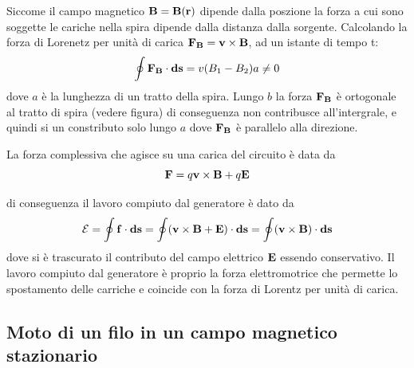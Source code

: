 Siccome il campo magnetico $\bold{B} = \bold{B}(\bold{r})$ dipende dalla poszione la forza a cui sono soggette le cariche nella spira dipende dalla distanza dalla sorgente. Calcolando la forza di Lorenetz  per unit\`a di carica  $\bold{F_B} = \bold{v} \times \bold{B}$, ad un istante di tempo t:
\begin{equation*}
	\oint \bold{F_B} \cdot \bold{ds} = v(B_1 - B_2)a \neq 0 
\end{equation*}
dove $a$ \`e la lunghezza di un tratto della spira.  Lungo $b$ la forza $\bold{F_B}$ \`e ortogonale al tratto di spira (vedere figura) di conseguenza non contribusce all'intergrale, e quindi si un constributo solo lungo $a$ dove $\bold{F_B}$ \`e parallelo alla direzione.

La forza complessiva che agisce su una carica  del circuito \`e data da 
\begin{equation*}
	\bold{F} = q \bold{v} \times \bold{B} + q\bold{E}
\end{equation*}

di conseguenza il lavoro compiuto dal generatore \`e dato da 
\begin{equation*}
	\mathcal{E} = \oint \bold{f} \cdot \bold{ds} = \oint (\bold{v} \times \bold{B} + \bold{E}) \cdot \bold{ds} = \oint (\bold{v} \times \bold{B}) \cdot \bold{ds}
\end{equation*}
dove si \`e trascurato il contributo del campo elettrico $\bold{E}$ essendo conservativo. Il lavoro compiuto dal generatore \`e  proprio la forza elettromotrice che permette lo spostamento delle carriche e coincide con la forza di Lorentz per unit\`a di carica.

\subsection{Moto di un filo in un campo magnetico stazionario}

